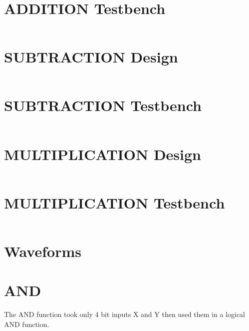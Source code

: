 \documentclass[
	letterpaper, %
	10pt, %
]{CSUniSchoolLabReport}
\begin{document}
\section{ADDITION Testbench}
\begin{center}
    \inputminted{octave}{verilog/add_4b/add_4b_test.v} %
\end{center}

\section{SUBTRACTION Design}
\begin{center}
    \inputminted{octave}{verilog/sub_4b/sub_4b.v} %
\end{center}
\section{SUBTRACTION Testbench}
\begin{center}
    \inputminted{octave}{verilog/sub_4b/sub_4b_test.v} %
\end{center}

\section{MULTIPLICATION Design}
\begin{center}
    \inputminted{octave}{verilog/mult_4b/mult_4b.v} %
\end{center}
\section{MULTIPLICATION Testbench}
\begin{center}
    \inputminted{octave}{verilog/mult_4b/mult_4b_test.v} %
\end{center}

\section{Waveforms}
\section{AND}
The AND function took only 4 bit inputs X and Y then used them in a logical AND function.
\end{document}
